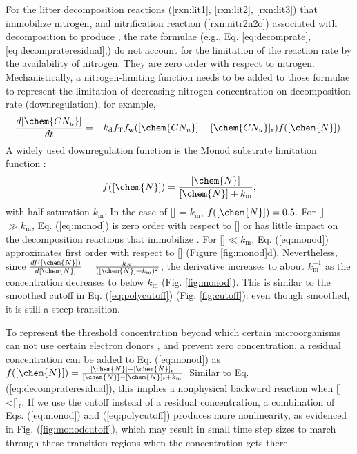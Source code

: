 \documentclass[gmd, manuscript]{copernicus}
\begin{document}
For the litter decomposition reactions (\ref{rxn:lit1}, \ref{rxn:lit2},
\ref{rxn:lit3}) that immobilize nitrogen, and nitrification reaction (\ref{rxn:nitr2n2o})
associated with decomposition
to produce , the rate formulae (e.g., Eq.
\ref{eq:decomprate}, \ref{eq:decomprateresidual},) do not account for the
limitation of the reaction rate by the availability of nitrogen. They are zero
order with respect to nitrogen. Mechanistically, a nitrogen-limiting function
needs to be added to those formulae to represent the limitation of decreasing
nitrogen concentration on decomposition rate (downregulation), for example, 
\begin{equation}
\frac{d [\chem{CN_u}]}{d t} = -k_\text{d} f_\text{T} f_\text{w} ([\chem{CN_u}] -
[\chem{CN_u}]_\text{r}) f([\chem{N}]).
\label{eq:decompresidualnlimit}
\end{equation}
A widely used downregulation function is the Monod substrate limitation
function \citep{Hammond2003,Tang2013a}:
\begin{equation}
f([\chem{N}])=\frac{[\chem{N}]}{[\chem{N}]+k_\text{m}},
\label{eq:monod}
\end{equation}
with half saturation $k_\text{m}$. In the case of [] = $k_\text{m}$,
$f([\chem{N}])=0.5$. For [] $\gg k_\text{m}$, Eq. (\ref{eq:monod}) is zero order with
respect to [] or has little impact on the decomposition reactions that
immobilize . For []$\ll k_\text{m}$, Eq. (\ref{eq:monod})
approximates first order with respect to [] (Figure \ref{fig:monod}d).
Nevertheless, since $\frac{df([\chem{N}])}{d
[\chem{N}]}=\frac{k_N}{([\chem{N}]+k_\text{m})^2}$,
the derivative increases to about $k_\text{m}^{-1}$ as the concentration
decreases to below $k_\text{m}$ (Fig. \ref{fig:monod}). This is similar to the
smoothed cutoff in Eq. (\ref{eq:polycutoff}) (Fig. \ref{fig:cutoff}): even
though smoothed, it is still a steep transition.

To represent the threshold concentration beyond which certain microorganisms
can not use certain electron donors \citep{Fennell1998}, and prevent zero concentration, a residual
concentration can be added to Eq. (\ref{eq:monod}) as
$f([\chem{N}])=\frac{[\chem{N}]-[\chem{N}]_\text{r}}{[\chem{N}] -
[\chem{N}]_\text{r}+k_\text{m}}.$
Similar to Eq. (\ref{eq:decomprateresidual}), this implies a nonphysical
backward reaction when []<[]$_\text{r}$. If we use the cutoff
instead of a residual concentration, a combination of Eqs. (\ref{eq:monod}) and
(\ref{eq:polycutoff}) produces more nonlinearity, as evidenced in Fig.
(\ref{fig:monodcutoff}), which may result in small time step sizes to
march through these transition regions when the concentration gets there.
\end{document}
